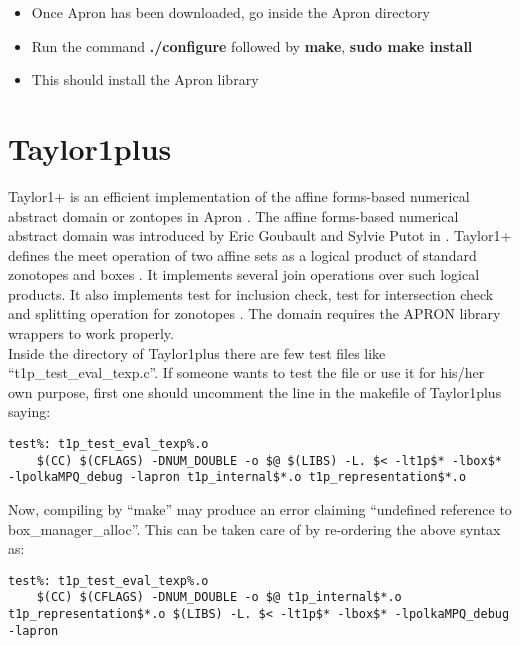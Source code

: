 \documentclass[a4paper]{article}
\begin{document}
\begin{itemize}
\item Once Apron has been downloaded, go inside the Apron directory
\item Run the command \textbf{./configure} followed by \textbf{make}, \textbf{sudo make install}
\item This should install the Apron library
\end{itemize}

\section{Taylor1plus}
Taylor1+ is an efficient implementation of the affine forms-based numerical abstract domain or zontopes in Apron \cite{taylor1}. The affine forms-based numerical abstract domain was introduced by Eric Goubault and Sylvie Putot in \cite{affineabstract}. Taylor1+ defines the meet operation of two affine sets as a logical product of standard zonotopes and boxes \cite{meet}. It implements several join operations over such logical products. It also implements test for inclusion check, test for intersection check and splitting operation for zonotopes \cite{split}. The domain requires the APRON library wrappers to work properly. \\
\indent Inside the directory of Taylor1plus there are few test files like ``t1p\_test\_eval\_texp.c''. If someone wants to test the file or use it for his/her own purpose, first one should uncomment the line in the makefile of Taylor1plus saying:
\begin{verbatim}
test%: t1p_test_eval_texp%.o 
	$(CC) $(CFLAGS) -DNUM_DOUBLE -o $@ $(LIBS) -L. $< -lt1p$* -lbox$* 
-lpolkaMPQ_debug -lapron t1p_internal$*.o t1p_representation$*.o 
\end{verbatim}
Now, compiling by ``make'' may produce an error claiming ``undefined reference to box\_manager\_alloc''. This can be taken care of by re-ordering the above syntax as:
\begin{verbatim}
test%: t1p_test_eval_texp%.o 
	$(CC) $(CFLAGS) -DNUM_DOUBLE -o $@ t1p_internal$*.o 
t1p_representation$*.o $(LIBS) -L. $< -lt1p$* -lbox$* -lpolkaMPQ_debug -lapron 
\end{verbatim}
\end{document}
